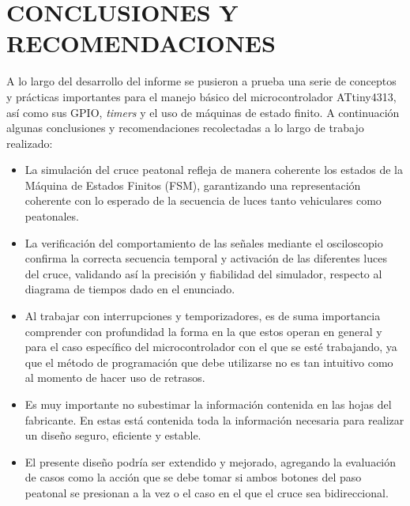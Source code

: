 \newpage
\section{CONCLUSIONES Y RECOMENDACIONES}
A lo largo del desarrollo del informe se pusieron a prueba una serie de conceptos y prácticas importantes para el manejo básico del microcontrolador ATtiny4313, así como sus GPIO, \textit{timers} y el uso de máquinas de estado finito. A continuación algunas conclusiones y recomendaciones recolectadas a lo largo de trabajo realizado: 

\begin{itemize}
    \item La simulación del cruce peatonal refleja de manera coherente los estados de la Máquina de Estados Finitos (FSM), garantizando una representación coherente con lo esperado de la secuencia de luces tanto vehiculares como peatonales. 

    \item La verificación del comportamiento de las señales mediante el osciloscopio confirma la correcta secuencia temporal y activación de las diferentes luces del cruce, validando así la precisión y fiabilidad del simulador, respecto al diagrama de tiempos dado en el enunciado. 

    \item Al trabajar con interrupciones y temporizadores, es de suma importancia comprender con profundidad la forma en la que estos operan en general y para el caso específico del microcontrolador con el que se esté trabajando, ya que el método de programación que debe utilizarse no es tan intuitivo como al momento de hacer uso de retrasos.

    \item Es muy importante no subestimar la información contenida en las hojas del fabricante. En estas está contenida toda la información necesaria para realizar un diseño seguro, eficiente y estable. 

    \item El presente diseño podría ser extendido y mejorado, agregando la evaluación de casos como la acción que se debe tomar si ambos botones del paso peatonal se presionan a la vez o el caso en el que el cruce sea bidireccional.  
\end{itemize} 